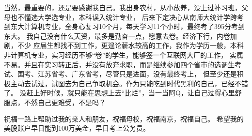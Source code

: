 当然，最重要的，还是要感谢我自己。我出身农村，从小放养，没上过补习班，父母也不懂选大学选专业，本科误入统计专业，
后来下定决心从南师大统计学跨考到东大计算机专业，全身心复习10个月，每天学习11个小时，最终考了395分考到东大。
我自己没有什么天资，最多是勤奋一点，愿意去卷。经济下行，内卷加剧，不少
应届生都找不到工作，更遑论薪水较高的工作，我作为学历一般，本科非计算机专业，实习经历不够“卷”的学生，能够签一个互联网大厂的工作，
实属不易。并且在实习转正后，并没有放弃求职，而是继续参加四个省市的选调生考试、国考、江苏省考、广东省考，尽管只是进面，没有最终考上，
但至少还是积极主动去试过，试图去为自己争取机会。作为只能吃到时代黑利的自己，已经不错了。
没赶上好时候，就只能在思想上去“比烂”，当一当阿Q，让自己过得心里舒服点，不然自己更难受，不是吗？

祝福一路上帮助过我的亲人和朋友，祝福母校，祝福南京，祝福自己。
希望我的美股账户早日能到100万美金，早日考上公务员。